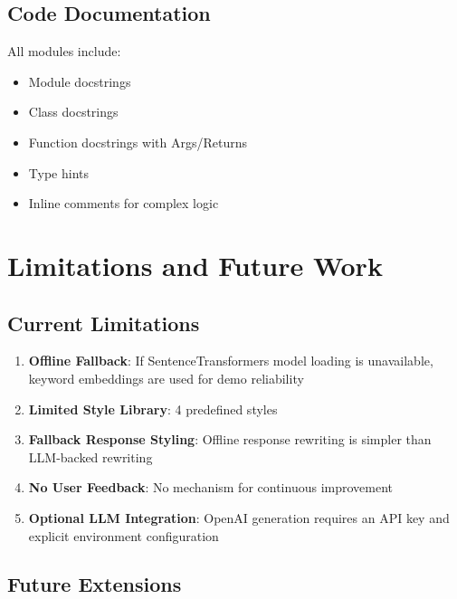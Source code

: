 \documentclass[11pt,a4paper]{article}
\begin{document}
\subsection{Code Documentation}

All modules include:
\begin{itemize}
    \item Module docstrings
    \item Class docstrings
    \item Function docstrings with Args/Returns
    \item Type hints
    \item Inline comments for complex logic
\end{itemize}

\section{Limitations and Future Work}

\subsection{Current Limitations}

\begin{enumerate}
    \item \textbf{Offline Fallback}: If SentenceTransformers model loading is unavailable, keyword embeddings are used for demo reliability
    \item \textbf{Limited Style Library}: 4 predefined styles
    \item \textbf{Fallback Response Styling}: Offline response rewriting is simpler than LLM-backed rewriting
    \item \textbf{No User Feedback}: No mechanism for continuous improvement
    \item \textbf{Optional LLM Integration}: OpenAI generation requires an API key and explicit environment configuration
\end{enumerate}

\subsection{Future Extensions}
\end{document}

